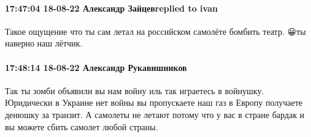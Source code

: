  
 
 
 
 

\paragraph{17:47:04 18-08-22 Александр Зайцевreplied to ivan}

Такое ощущение что ты сам летал на российском самолёте бомбить театр. 😀ты
наверно наш лётчик.

\paragraph{17:48:14 18-08-22 Александр Рукавишников}

Так ты зомби объявили вы нам войну иль так играетесь в войнушку. Юридически в
Украине нет войны вы пропускаете наш газ в Европу получаете денюшку за транзит.
А самолеты не летают потому что у вас в стране бардак и вы можете сбить самолет
любой страны.
